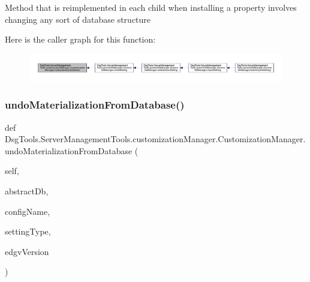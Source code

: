 \begin{DoxyVerb}Method that is reimplemented in each child when installing a property involves changing any sort of database structure
\end{DoxyVerb}
 Here is the caller graph for this function\+:
\nopagebreak
\begin{figure}[H]
\begin{center}
\leavevmode
\includegraphics[width=350pt]{class_dsg_tools_1_1_server_management_tools_1_1customization_manager_1_1_customization_manager_a6d267613675bed63c0e45cba18f277c1_icgraph}
\end{center}
\end{figure}
\mbox{\label{class_dsg_tools_1_1_server_management_tools_1_1customization_manager_1_1_customization_manager_a108ee02a6c33d1fd38f72eb3c9a4780f}} 
\subsubsection{\texorpdfstring{undo\+Materialization\+From\+Database()}{undoMaterializationFromDatabase()}}
{\footnotesize\ttfamily def Dsg\+Tools.\+Server\+Management\+Tools.\+customization\+Manager.\+Customization\+Manager.\+undo\+Materialization\+From\+Database (\begin{DoxyParamCaption}\item[{}]{self,  }\item[{}]{abstract\+Db,  }\item[{}]{config\+Name,  }\item[{}]{setting\+Type,  }\item[{}]{edgv\+Version }\end{DoxyParamCaption})}


